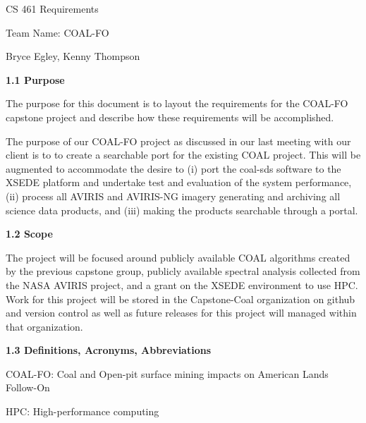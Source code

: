 \documentclass[a4paper,12pt]{article}
\begin{document}
\sloppy

\noindent CS 461 Requirements\newline


\noindent Team Name: COAL-FO\newline


\noindent Bryce Egley, Kenny Thompson\newline


\newline


\noindent \textbf{1.1 Purpose}\newline


\noindent The purpose for this document is to layout the requirements for the COAL-FO capstone project and describe how these requirements will be accomplished. \newline

\noindent The purpose of our COAL-FO project as discussed in our last meeting with our client is to to create a searchable port for the existing COAL project. This will be augmented to accommodate the desire to (i) port the coal-sds software to the XSEDE platform and undertake test and evaluation of the system performance, (ii) process all AVIRIS and AVIRIS-NG imagery generating and archiving all science data products, and (iii) making the products searchable through a portal. \newline

\noindent \textbf{1.2 Scope}\newline


\noindent The project will be focused around publicly available COAL algorithms created by the previous capstone group, publicly available spectral analysis collected from the NASA AVIRIS project, and a grant on the XSEDE environment to use HPC. Work for this project will be stored in the Capstone-Coal organization on github and version control as well as future releases for this project will managed within that organization.\newline


\noindent \textbf{1.3 Definitions, Acronyms, Abbreviations}\newline


\noindent COAL-FO: Coal and Open-pit surface mining impacts on American Lands Follow-On\newline


\noindent HPC: High-performance computing\newline
\end{document}
